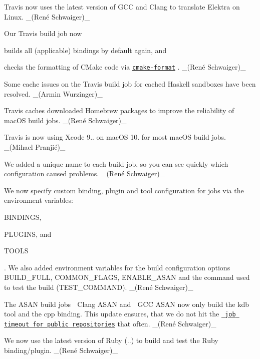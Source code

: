 \begin{DoxyItemize}
\item Travis now uses the latest version of G\+CC and Clang to translate Elektra on Linux. \+\_\+(René Schwaiger)\+\_\+
\item Our Travis build job now
\begin{DoxyItemize}
\item builds all (applicable) bindings by default again, and
\item checks the formatting of C\+Make code via \href{https://github.com/cheshirekow/cmake_format}{\texttt{ {\ttfamily cmake-\/format}}} . \+\_\+(René Schwaiger)\+\_\+
\end{DoxyItemize}
\item Some cache issues on the Travis build job for cached Haskell sandboxes have been resolved. \+\_\+(\+Armin Wurzinger)\+\_\+
\item Travis caches downloaded Homebrew packages to improve the reliability of mac\+OS build jobs. \+\_\+(René Schwaiger)\+\_\+
\item Travis is now using Xcode 9.. on mac\+OS 10. for most mac\+OS build jobs. \+\_\+(Mihael Pranjić)\+\_\+
\item We added a unique name to each build job, so you can see quickly which configuration caused problems. \+\_\+(René Schwaiger)\+\_\+
\item We now specify custom binding, plugin and tool configuration for jobs via the environment variables\+:
\begin{DoxyItemize}
\item {\ttfamily B\+I\+N\+D\+I\+N\+GS},
\item {\ttfamily P\+L\+U\+G\+I\+NS}, and
\item {\ttfamily T\+O\+O\+LS}
\end{DoxyItemize}

. We also added environment variables for the build configuration options {\ttfamily B\+U\+I\+L\+D\+\_\+\+F\+U\+LL}, {\ttfamily C\+O\+M\+M\+O\+N\+\_\+\+F\+L\+A\+GS}, {\ttfamily E\+N\+A\+B\+L\+E\+\_\+\+A\+S\+AN} and the command used to test the build ({\ttfamily T\+E\+S\+T\+\_\+\+C\+O\+M\+M\+A\+ND}). \+\_\+(René Schwaiger)\+\_\+
\item The A\+S\+AN build jobs {\ttfamily 🍏 Clang A\+S\+AN} and {\ttfamily 🐧 G\+CC A\+S\+AN} now only build the {\ttfamily kdb} tool and the {\ttfamily cpp} binding. This update ensures, that we do not hit the \href{https://docs.travis-ci.com/user/customizing-the-build/\#build-timeouts}{\texttt{ job timeout for public repositories}} that often. \+\_\+(René Schwaiger)\+\_\+
\item We now use the latest version of Ruby ({..}) to build and test the Ruby binding/plugin. \+\_\+(René Schwaiger)\+\_\+
\end{DoxyItemize}

